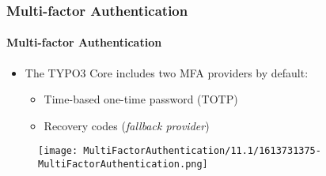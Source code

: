 %

\begin{frame}[fragile]
	\frametitle{Multi-factor Authentication}
	\framesubtitle{Multi-factor Authentication}


	\begin{itemize}
		\item The TYPO3 Core includes two MFA providers by default:

			\begin{itemize}
				\item Time-based one-time password (TOTP)
				\item Recovery codes (\textit{fallback provider})
			\end{itemize}

	\end{itemize}

	\begin{figure}
		\texttt{[image: MultiFactorAuthentication/11.1/1613731375-MultiFactorAuthentication.png]}
	\end{figure}

\end{frame}

